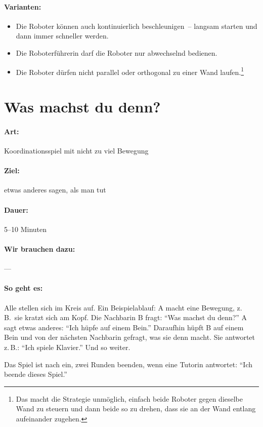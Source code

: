 \paragraph{Varianten:}
\begin{itemize}
	\item Die Roboter können auch kontinuierlich beschleunigen~-- langsam starten und dann immer schneller werden.
	\item Die Roboterführerin darf die Roboter nur abwechselnd bedienen.
	\item Die Roboter dürfen nicht parallel oder orthogonal zu einer Wand laufen.\footnote{Das macht die Strategie unmöglich, einfach beide Roboter gegen dieselbe Wand zu steuern und dann beide so zu drehen, dass sie an der Wand entlang aufeinander zugehen.}
\end{itemize}

\section{Was machst du denn?}
\paragraph{Art:} Koordinationsspiel mit nicht zu viel Bewegung
\paragraph{Ziel:} etwas anderes sagen, als man tut
\paragraph{Dauer:} 5--10 Minuten
\paragraph{Wir brauchen dazu:} ---
\paragraph{So geht es:} Alle stellen sich im Kreis auf. Ein Beispielablauf: A macht eine Bewegung, z.\,B.~sie kratzt sich am Kopf. Die Nachbarin B fragt: "`Was machst du denn?"' A sagt etwas anderes: "`Ich hüpfe auf einem Bein."'
Daraufhin hüpft B auf einem Bein und von der nächsten Nachbarin gefragt, was sie denn macht. Sie antwortet z.\,B.: "`Ich spiele Klavier."' Und so weiter.

Das Spiel ist nach ein, zwei Runden beenden, wenn eine Tutorin antwortet: "`Ich beende dieses Spiel."'
